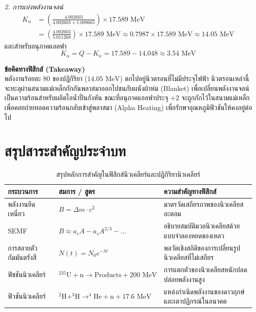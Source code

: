 \begin{psctexample}
\textit{2. การแบ่งพลังงานจลน์}
\begin{align}
K_n &= \left(\frac{4.002603}{4.002603 + 1.008665}\right) \times 17.589\text{ MeV} \nonumber \\
&= \left(\frac{4.002603}{5.011268}\right) \times 17.589\text{ MeV} \approx 0.7987 \times 17.589\text{ MeV} \approx 14.05\text{ MeV}
\end{align}
และสำหรับอนุภาคแอลฟา
\begin{equation}
K_\alpha = Q - K_n = 17.589 - 14.048 \approx 3.54\text{ MeV}
\end{equation}

\textbf{ข้อคิดทางฟิสิกส์ (Takeaway)} \\
พลังงานร้อยละ 80 ของปฏิกิริยา ($14.05\text{ MeV}$) ตกไปอยู่นิวตรอนที่ไม่มีประจุไฟฟ้า นิวตรอนเหล่านี้จะทะลุผ่านสนามแม่เหล็กกักกันพลาสมาออกไปชนกับผนังผ้าห่ม (Blanket) เพื่อเปลี่ยนพลังงานจลน์เป็นความร้อนสำหรับผลิตไอน้ำปั่นกังหัน ขณะที่อนุภาคแอลฟาประจุ $+2$ จะถูกกักไว้ในสนามแม่เหล็กเพื่อคอยถ่ายทอดความร้อนกลับเข้าสู่พลาสมา (Alpha Heating) เพื่อรักษาอุณหภูมิฟิวชันให้คงอยู่ต่อไป
\qedexam
\end{psctexample}

\section{สรุปสาระสำคัญประจำบท}

\begin{table}[H]
\centering
\caption{สรุปหลักการสำคัญในฟิสิกส์นิวเคลียร์และปฏิกิริยานิวเคลียร์}
\label{tab:nuclear_summary}
\small
\begin{tabularx}{\textwidth}{l >{\centering\arraybackslash}p{4.2cm} Y}
\toprule
\textbf{กระบวนการ} & \textbf{สมการ / สูตร} & \textbf{ความสำคัญทางฟิสิกส์} \\
\midrule
พลังงานยึดเหนี่ยว & $B = \Delta m \cdot c^2$ & มาตรวัดเสถียรภาพของนิวเคลียสอะตอม \\
SEMF & $B \approx a_v A - a_s A^{2/3} - \dots$ & อธิบายสมบัติมวลนิวเคลียสด้วยแบบจำลองหยดของเหลว \\
การสลายตัวกัมมันตรังสี & $N(t) = N_0 e^{-\lambda t}$ & พลวัตเชิงสถิติของการเปลี่ยนรูปนิวเคลียสที่ไม่เสถียร \\
ฟิชชันนิวเคลียร์ & $^{235}\text{U} + \text{n} \to \text{Products} + 200\text{ MeV}$ & การแตกตัวของนิวเคลียสหนักปลดปล่อยพลังงานสูง \\
ฟิวชันนิวเคลียร์ & $^2\text{H} + ^3\text{H} \to ^4\text{He} + \text{n} + 17.6\text{ MeV}$ & แหล่งกำเนิดพลังงานของดาวฤกษ์และเตาปฏิกรณ์ในอนาคต \\
\bottomrule
\end{tabularx}
\end{table}

